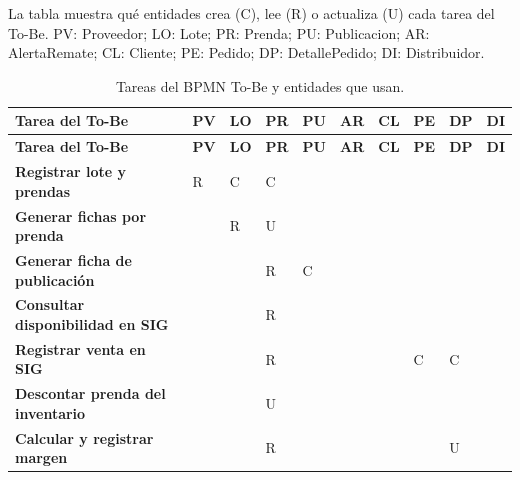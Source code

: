 \documentclass[11pt,letterpaper]{article}
\begin{document}
La tabla muestra qué entidades crea (C), lee (R) o actualiza (U) cada tarea del To-Be. PV: Proveedor; LO: Lote; PR: Prenda; PU: Publicacion; AR: AlertaRemate; CL: Cliente; PE: Pedido; DP: DetallePedido; DI: Distribuidor.
{\scriptsize
\setlength{\tabcolsep}{3pt}\renewcommand{\arraystretch}{1.15}
\begin{longtable}{>{\raggedright\arraybackslash}p{}>{\centering\arraybackslash}p{}>{\centering\arraybackslash}p{}>{\centering\arraybackslash}p{}>{\centering\arraybackslash}p{}>{\centering\arraybackslash}p{}>{\centering\arraybackslash}p{}>{\centering\arraybackslash}p{}>{\centering\arraybackslash}p{}>{\centering\arraybackslash}p{}}
\caption{Tareas del BPMN To-Be y entidades que usan.}\\
\hline
\rowcolor[HTML]{D9EAF7}\textbf{\textbf{Tarea del To-Be}} & \textbf{\textbf{PV}} & \textbf{\textbf{LO}} & \textbf{\textbf{PR}} & \textbf{\textbf{PU}} & \textbf{\textbf{AR}} & \textbf{\textbf{CL}} & \textbf{\textbf{PE}} & \textbf{\textbf{DP}} & \textbf{\textbf{DI}} \\
\hline
\endfirsthead
\hline
\rowcolor[HTML]{D9EAF7}\textbf{\textbf{Tarea del To-Be}} & \textbf{\textbf{PV}} & \textbf{\textbf{LO}} & \textbf{\textbf{PR}} & \textbf{\textbf{PU}} & \textbf{\textbf{AR}} & \textbf{\textbf{CL}} & \textbf{\textbf{PE}} & \textbf{\textbf{DP}} & \textbf{\textbf{DI}} \\
\hline
\endhead
\textbf{Registrar lote y prendas} & R & C & C &  &  &  &  &  &  \\
\hline
\textbf{Generar fichas por prenda} &  & R & U &  &  &  &  &  &  \\
\hline
\textbf{Generar ficha de publicación} &  &  & R & C &  &  &  &  &  \\
\hline
\textbf{Consultar disponibilidad en SIG} &  &  & R &  &  &  &  &  &  \\
\hline
\textbf{Registrar venta en SIG} &  &  & R &  &  &  & C & C &  \\
\hline
\textbf{Descontar prenda del inventario} &  &  & U &  &  &  &  &  &  \\
\hline
\textbf{Calcular y registrar margen} &  &  & R &  &  &  &  & U &  \\

\end{longtable}}
\end{document}
